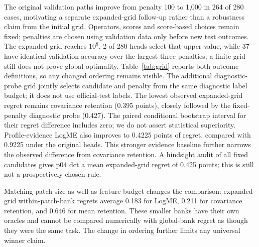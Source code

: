 The original validation paths improve from penalty 100 to 1,000 in 264 of 280 cases, motivating a separate expanded-grid follow-up rather than a robustness claim from the initial grid. Operators, scores and score-based choices remain fixed; penalties are chosen using validation data only before new test outcomes. The expanded grid reaches $10^8$. 2 of 280 heads select that upper value, while 37 have identical validation accuracy over the largest three penalties; a finite grid still does not prove global optimality. Table~\ref{tab:grid} reports both outcome definitions, so any changed ordering remains visible. The additional diagnostic-probe grid jointly selects candidate and penalty from the same diagnostic label budget; it does not use official-test labels. The lowest observed expanded-grid regret remains covariance retention (0.395 points), closely followed by the fixed-penalty diagnostic probe (0.427). The paired conditional bootstrap interval for their regret difference includes zero; we do not assert statistical superiority. Profile-evidence LogME also improves to 0.4225 points of regret, compared with 0.9225 under the original heads. This stronger evidence baseline further narrows the observed difference from covariance retention. A hindsight audit of all fixed candidates gives p04 dct a mean expanded-grid regret of 0.425 points; this is still not a prospectively chosen rule.

Matching patch size as well as feature budget changes the comparison: expanded-grid within-patch-bank regrets average 0.183 for LogME, 0.211 for covariance retention, and 0.646 for mean retention. These smaller banks have their own oracles and cannot be compared numerically with global-bank regret as though they were the same task. The change in ordering further limits any universal winner claim.

